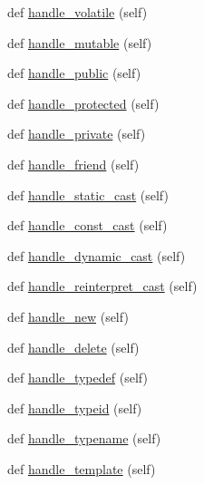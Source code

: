 \begin{DoxyCompactItemize}
def \mbox{\hyperlink{classcpp_1_1ast_1_1_ast_builder_a2dfb23ddeb05e1017b3d1ce85a40cacb}{handle\+\_\+volatile}} (self)
\item 
def \mbox{\hyperlink{classcpp_1_1ast_1_1_ast_builder_a6a642353cfe2cddd1a60cbb1011df787}{handle\+\_\+mutable}} (self)
\item 
def \mbox{\hyperlink{classcpp_1_1ast_1_1_ast_builder_a1e69925578e0ee0a2b7aeb219eda449b}{handle\+\_\+public}} (self)
\item 
def \mbox{\hyperlink{classcpp_1_1ast_1_1_ast_builder_aa4ff62142927f8f245a2030b444676ee}{handle\+\_\+protected}} (self)
\item 
def \mbox{\hyperlink{classcpp_1_1ast_1_1_ast_builder_a8bc5f9563f5ead3abba5a71187162867}{handle\+\_\+private}} (self)
\item 
def \mbox{\hyperlink{classcpp_1_1ast_1_1_ast_builder_ab9f7d81019317c6ccfd492bd2c0c9579}{handle\+\_\+friend}} (self)
\item 
def \mbox{\hyperlink{classcpp_1_1ast_1_1_ast_builder_ab7577b3a2bd22c1bccb656493de379f3}{handle\+\_\+static\+\_\+cast}} (self)
\item 
def \mbox{\hyperlink{classcpp_1_1ast_1_1_ast_builder_a4dae74f1d036f63fc1080962ab0208fc}{handle\+\_\+const\+\_\+cast}} (self)
\item 
def \mbox{\hyperlink{classcpp_1_1ast_1_1_ast_builder_a659b5ad02ffebe26c1496a319128fbd1}{handle\+\_\+dynamic\+\_\+cast}} (self)
\item 
def \mbox{\hyperlink{classcpp_1_1ast_1_1_ast_builder_a06d75904ba7487c7966d073aaa3d74e9}{handle\+\_\+reinterpret\+\_\+cast}} (self)
\item 
def \mbox{\hyperlink{classcpp_1_1ast_1_1_ast_builder_a86f5769e0460524691ae0d135d30f101}{handle\+\_\+new}} (self)
\item 
def \mbox{\hyperlink{classcpp_1_1ast_1_1_ast_builder_aa5b7a781afe524bebdf42bdeb4766507}{handle\+\_\+delete}} (self)
\item 
def \mbox{\hyperlink{classcpp_1_1ast_1_1_ast_builder_a808eb3d955ca2e3a957abb35dc577c66}{handle\+\_\+typedef}} (self)
\item 
def \mbox{\hyperlink{classcpp_1_1ast_1_1_ast_builder_ac30cfc1a3a455310a9ccac885d2d0d7c}{handle\+\_\+typeid}} (self)
\item 
def \mbox{\hyperlink{classcpp_1_1ast_1_1_ast_builder_a4b7b3bb4f47f67052b04e5da173d1c6b}{handle\+\_\+typename}} (self)
\item 
def \mbox{\hyperlink{classcpp_1_1ast_1_1_ast_builder_a0f4d74520697ec05eb6b549daada5a5d}{handle\+\_\+template}} (self)

\end{DoxyCompactItemize}
